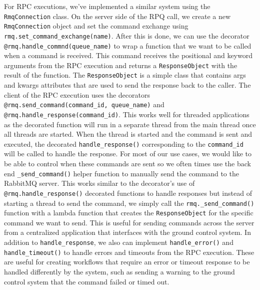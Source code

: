 For RPC executions, we've implemented a similar system using the \texttt{RmqConnection} class.
On the server side of the RPQ call, we create a new \texttt{RmqConnection} object and set the command exchange using \texttt{rmq.set\_command\_exchange(name)}.
After this is done, we can use the decorator \texttt{@rmq.handle\_commnd(queue\_name)} to wrap a function that we want to be called when a command is received.
This command receives the positional and keyword arguments from the RPC execution and returns a \texttt{ResponseObject} with the result of the function.
The \texttt{ResponseObject} is a simple class that contains args and kwargs attributes that are used to send the response back to the caller.
The client of the RPC execution uses the decorators \texttt{@rmq.send\_command(command\_id, queue\_name)} and \texttt{@rmq.handle\_response(command\_id)}.
This works well for threaded applications as the decorated function will run in a separate thread from the main thread once all threads are started. 
When the thread is started and the command is sent and executed, the decorated \texttt{handle\_response()} corresponding to the \texttt{command\_id} will be called to handle the response.
For most of our use cases, we would like to be able to control when these commands are sent so we often times use the back end \texttt{\_send\_command()} helper function to manually send the command to the RabbitMQ server.
This works similar to the decorator's use of \texttt{@rmq.handle\_response()} decorated functions to handle responses but instead of starting a thread to send the command, we simply call the \texttt{rmq.\_send\_command()} function with a lambda function that creates the \texttt{ResponseObject} for the specific command we want to send.
This is useful for sending commands across the server from a centralized application that interfaces with the ground control system.
In addition to \texttt{handle\_response}, we also can implement \texttt{handle\_error()} and \texttt{handle\_timeout()} to handle errors and timeouts from the RPC execution.
These are useful for creating workflows that require an error or timeout response to be handled differently by the system, such as sending a warning to the ground control system that the command failed or timed out.

